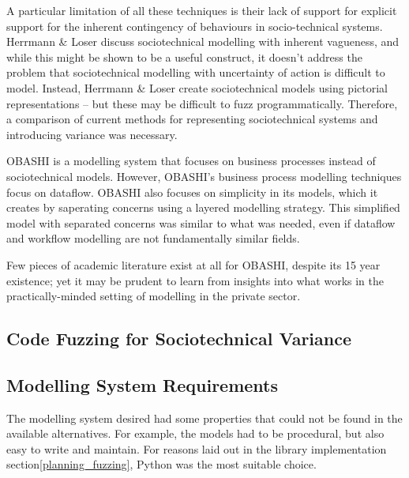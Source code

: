 \documentclass{sig-alternate}
\begin{document}
A particular limitation of all these techniques is their lack of support for
explicit support for the inherent contingency of behaviours in socio-technical systems.
\label{related_head}
Herrmann \& Loser\cite{Herrmann1999} discuss sociotechnical modelling with inherent vagueness, and while this might be shown to be a useful construct, it doesn't address the problem that sociotechnical modelling with uncertainty of action is difficult to model. Instead, Herrmann \& Loser create sociotechnical models using pictorial representations -- but these may be difficult to fuzz programmatically. Therefore, a comparison of current methods for representing sociotechnical systems and introducing variance was necessary. \par

OBASHI\cite{ObashiMethodology} is a modelling system that focuses on business processes instead of sociotechnical models. However, OBASHI's business process modelling techniques focus on dataflow. OBASHI also focuses on simplicity in its models, which it creates by saperating concerns using a layered modelling strategy. This simplified model with separated concerns was similar to what was needed, even if dataflow and workflow modelling are not fundamentally similar fields. \par 

Few pieces of academic literature exist at all for OBASHI, despite its 15 year existence; yet it may be prudent to learn from insights into what works in the practically-minded setting of modelling in the private sector. \par

\subsection{Code Fuzzing for Sociotechnical Variance}

\subsection{Modelling System Requirements}\label{planning_modelling_requirements}

The modelling system desired had some properties that could not be found in the available alternatives. For example, the models had to be procedural, but also easy to write and maintain. For reasons laid out in the library implementation section\cref{planning_fuzzing}, Python was the most suitable choice. \par
\end{document}
